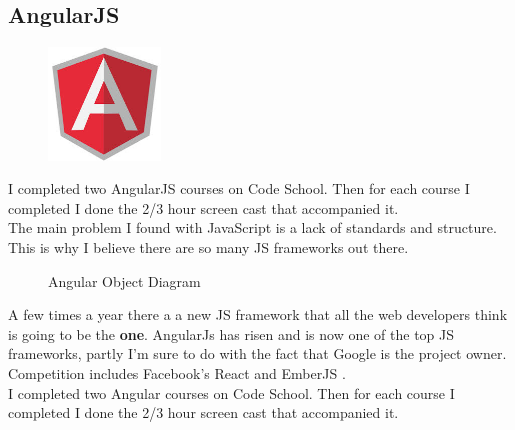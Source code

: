 \subsection{AngularJS}
\begin{figure}
	\includegraphics[width=3cm]{img/mobile-app/logos/angular.jpg}
	\centering
\end{figure}

I completed two AngularJS \cite{angular} courses on Code School. 
Then for each course I completed I done the 2/3 hour screen cast that accompanied it.
\\
The main problem I found with JavaScript is a lack of standards and structure. 
This is why I believe there are so many JS frameworks out there.
\begin{figure}[H] 
	\caption{Angular Object Diagram}
	\label{fig:speciation}
\end{figure}
A few times a year there a a new JS framework that all the web developers think is going to be the \textbf{one}.
AngularJs has risen and is now one of the top JS frameworks, partly I'm sure to do with the fact that Google is the project owner.
Competition includes Facebook's React \cite{react} and EmberJS \cite{ember}.
\\

I completed two Angular courses on Code School. 
Then for each course I completed I done the 2/3 hour screen cast that accompanied it.
\\

